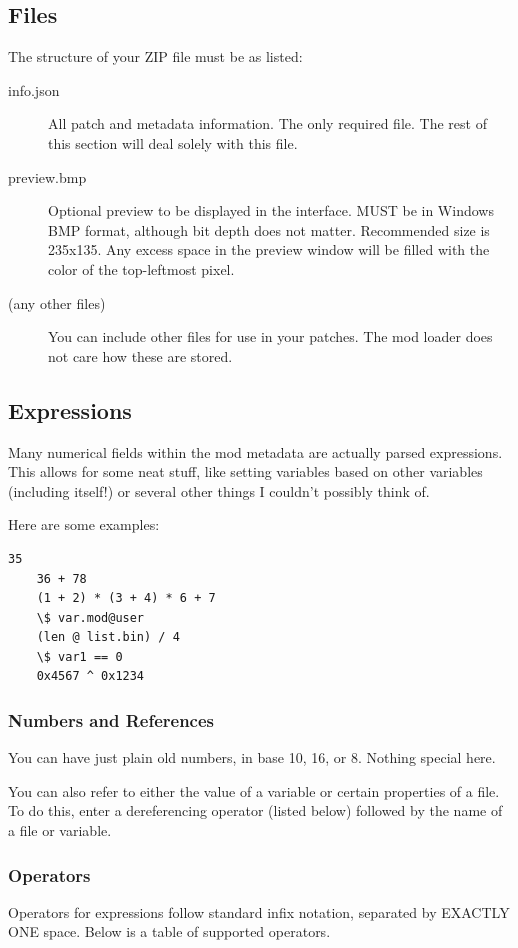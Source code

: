 \documentclass[12pt,a4paper,notitlepage]{article}
\begin{document}
\subsection{Files}
\label{subsec:create-files}
The structure of your ZIP file must be as listed:
\begin{description}
\item[info.json] All patch and metadata information. The only required file. The rest of this section will deal solely with this file.
\item[preview.bmp] Optional preview to be displayed in the interface. MUST be in Windows BMP format, although bit depth does not matter. Recommended size is 235x135. Any excess space in the preview window will be filled with the color of the top-leftmost pixel.
\item[(any other files)] You can include other files for use in your patches. The mod loader does not care how these are stored.
\end{description}

\subsection{Expressions}
\label{subsec:create-expr}
Many numerical fields within the mod metadata are actually parsed expressions. This allows for some neat stuff, like setting variables based on other variables (including itself!) or several other things I couldn't possibly think of.

Here are some examples:
\begin{lstlisting}[breaklines=true]
    35
    36 + 78
    (1 + 2) * (3 + 4) * 6 + 7
    \$ var.mod@user
    (len @ list.bin) / 4
    \$ var1 == 0
    0x4567 ^ 0x1234
\end{lstlisting}

\subsubsection{Numbers and References}
You can have just plain old numbers, in base 10, 16, or 8. Nothing special here.

You can also refer to either the value of a variable or certain properties of a file. To do this, enter a dereferencing operator (listed below) followed by the name of a file or variable.

\subsubsection{Operators}
Operators for expressions follow standard infix notation, separated by EXACTLY ONE space. Below is a table of supported operators.
\end{document}
